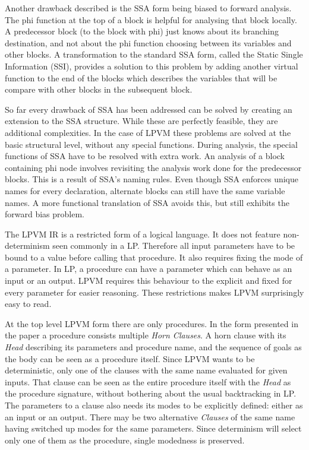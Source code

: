 Another drawback described is the SSA form being biased to forward
analysis. The phi function at the top of a block is helpful for analysing that
block locally. A predecessor block (to the block with phi) just knows about its
branching destination, and not about the phi function choosing between its
variables and other blocks. A transformation to the standard SSA form, called
the Static Single Information (SSI), provides a solution to this problem by
adding another virtual function to the end of the blocks which describes the
variables that will be compare with other blocks in the subsequent block.

So far every drawback of SSA has been addressed can be solved by creating an
extension to the SSA structure. While these are perfectly feasible, they are
additional complexities. In the case of LPVM these problems are solved at the
basic structural level, without any special functions. During analysis, the
special functions of SSA have to be resolved with extra work. An analysis of a
block containing phi node involves revisiting the analysis work done for the
predecessor blocks. This is a result of SSA's naming rules. Even
though SSA enforces unique names for every declaration, alternate blocks can
still have the same variable names. A more functional translation of SSA
avoids this, but still exhibits the forward bias problem.


The LPVM IR is a restricted form of a logical language. It does not feature
non-determinism seen commonly in a LP. Therefore all input parameters have to
be bound to a value before calling that procedure. It also requires fixing the
mode of a parameter. In LP, a procedure can have a parameter which can behave
as an input or an output. LPVM requires this behaviour to the explicit and
fixed for every parameter for easier reasoning. These restrictions makes LPVM
surprisingly easy to read.

At the top level LPVM form there are only procedures. In the form presented in
the paper a procedure consists multiple \textit{Horn Clauses}. A horn clause
with its \textit{Head} describing its parameters and procedure name, and the
sequence of goals as the body can be seen as a procedure itself. Since LPVM
wants to be deterministic, only one of the clauses with the same name evaluated
for given inputs. That clause can be seen as the entire procedure itself with
the \textit{Head} as the procedure signature, without bothering about the usual
backtracking in LP. The parameters to a clause also needs its modes to be
explicitly defined: either as an input or an output. There may be two
alternative \textit{Clauses} of the same name having switched up modes for the
same parameters. Since determinism will select only one of them as the
procedure, single modedness is preserved.

